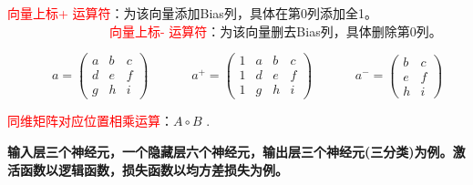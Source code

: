\begin{definition}
\textcolor{red}{向量上标+ 运算符}：为该向量添加Bias列，具体在第0列添加全1。\\
\textcolor{red}{~~~~~~~~~~~~~~~~向量上标- 运算符}：为该向量删去Bias列，具体删除第0列。
\end{definition}
\begin{example}
~~~~~~~$a = \left(
 \begin{matrix}
   a & b & c \\
   d & e & f \\
   g & h & i
  \end{matrix}
  \right) $~~~~~~
  $a^+ = \left(
\begin{matrix}
   1 & a & b & c \\
   1 & d & e & f \\
   1 & g & h & i
  \end{matrix}
  \right) $~~~~~~
  $a^- = \left(
\begin{matrix}
    b & c \\
    e & f \\
    h & i
  \end{matrix}
  \right) $
\end{example}
\begin{definition}
\textcolor{red}{同维矩阵对应位置相乘运算}：$A\circ B$ .
\end{definition}
\textbf{输入层三个神经元，一个隐藏层六个神经元，输出层三个神经元(三分类)为例。激活函数以逻辑函数，损失函数以均方差损失为例。}
~\\~\\


